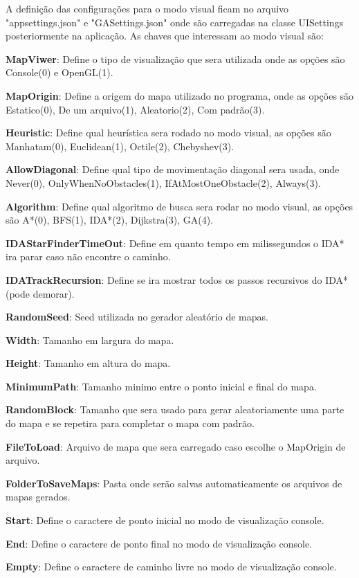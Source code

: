 A definição das configurações para o modo visual ficam no arquivo "appsettings.json" e "GASettings.json" onde são carregadas na classe UISettings posteriormente na aplicação. As chaves que interessam ao modo visual são:


\textbf{MapViwer}: Define o tipo de visualização que sera utilizada onde as opções são Console(0) e OpenGL(1).

\textbf{MapOrigin}: Define a origem do mapa utilizado no programa, onde as opções são Estatico(0), De um arquivo(1), Aleatorio(2), Com padrão(3).

\textbf{Heuristic}: Define qual heurística sera rodado no modo visual, as opções são Manhatam(0), Euclidean(1), Octile(2), Chebyshev(3).

\textbf{AllowDiagonal}: Define qual tipo de movimentação diagonal sera usada, onde Never(0), OnlyWhenNoObstacles(1), IfAtMostOneObstacle(2), Always(3).

\textbf{Algorithm}: Define qual algoritmo de busca sera rodar no modo visual, as opções são  A\**(0), BFS(1), IDA\**(2), Dijkstra(3), GA(4).
 
\textbf{IDAStarFinderTimeOut}: Define em quanto tempo em milissegundos o IDA\** ira parar caso não encontre o caminho.

\textbf{IDATrackRecursion}: Define se ira mostrar todos os passos recursivos do IDA\** (pode demorar).
 
\textbf{RandomSeed}: Seed utilizada no gerador aleatório de mapas.

\textbf{Width}: Tamanho em largura do mapa.

\textbf{Height}: Tamanho em altura do mapa.

\textbf{MinimumPath}: Tamanho minimo entre o ponto inicial e final do mapa.

\textbf{RandomBlock}: Tamanho que sera usado para gerar aleatoriamente uma parte do mapa e se repetira para completar o mapa com padrão.

\textbf{FileToLoad}: Arquivo de mapa que sera carregado caso escolhe o MapOrigin de arquivo.

\textbf{FolderToSaveMaps}: Pasta onde serão salvas automaticamente os arquivos de mapas gerados.

\textbf{Start}: Define o caractere de ponto inicial no modo de visualização console.

\textbf{End}: Define o caractere de ponto final no modo de visualização console.

\textbf{Empty}: Define o caractere de caminho livre no modo de visualização console.

